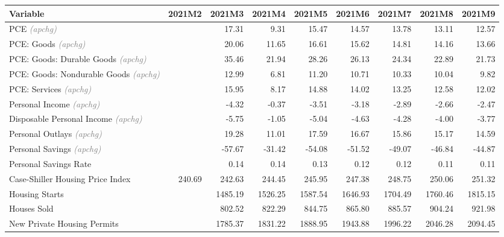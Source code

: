 \documentclass[11pt, letterpaper]{article}\usepackage[]{graphicx}\usepackage[]{color}
\begin{document}
\begin{table}[H]
\centering
\begingroup\fontsize{10pt}{12pt}\selectfont
\begin{tabular}{lrrrrrrrr}
  \hline
Variable & 2021M2 & 2021M3 & 2021M4 & 2021M5 & 2021M6 & 2021M7 & 2021M8 & 2021M9 \\ 
  \hline
PCE \textit{\footnotesize\textcolor{gray}{(apchg)}} &  & 17.31 & 9.31 & 15.47 & 14.57 & 13.78 & 13.11 & 12.57 \\ 
  PCE: Goods \textit{\footnotesize\textcolor{gray}{(apchg)}} &  & 20.06 & 11.65 & 16.61 & 15.62 & 14.81 & 14.16 & 13.66 \\ 
  PCE: Goods: Durable Goods \textit{\footnotesize\textcolor{gray}{(apchg)}} &  & 35.46 & 21.94 & 28.26 & 26.13 & 24.34 & 22.89 & 21.73 \\ 
  PCE: Goods: Nondurable Goods \textit{\footnotesize\textcolor{gray}{(apchg)}} &  & 12.99 & 6.81 & 11.20 & 10.71 & 10.33 & 10.04 & 9.82 \\ 
  PCE: Services \textit{\footnotesize\textcolor{gray}{(apchg)}} &  & 15.95 & 8.17 & 14.88 & 14.02 & 13.25 & 12.58 & 12.02 \\ 
  Personal Income \textit{\footnotesize\textcolor{gray}{(apchg)}} &  & -4.32 & -0.37 & -3.51 & -3.18 & -2.89 & -2.66 & -2.47 \\ 
  Disposable Personal Income \textit{\footnotesize\textcolor{gray}{(apchg)}} &  & -5.75 & -1.05 & -5.04 & -4.63 & -4.28 & -4.00 & -3.77 \\ 
  Personal Outlays \textit{\footnotesize\textcolor{gray}{(apchg)}} &  & 19.28 & 11.01 & 17.59 & 16.67 & 15.86 & 15.17 & 14.59 \\ 
  Personal Savings \textit{\footnotesize\textcolor{gray}{(apchg)}} &  & -57.67 & -31.42 & -54.08 & -51.52 & -49.07 & -46.84 & -44.87 \\ 
  Personal Savings Rate &  & 0.14 & 0.14 & 0.13 & 0.12 & 0.12 & 0.11 & 0.11 \\ 
  Case-Shiller Housing Price Index & 240.69 & 242.63 & 244.45 & 245.95 & 247.38 & 248.75 & 250.06 & 251.32 \\ 
  Housing Starts &  & 1485.19 & 1526.25 & 1587.54 & 1646.93 & 1704.49 & 1760.46 & 1815.15 \\ 
  Houses Sold &  & 802.52 & 822.29 & 844.75 & 865.80 & 885.57 & 904.24 & 921.98 \\ 
  New Private Housing Permits &  & 1785.37 & 1831.22 & 1888.95 & 1943.88 & 1996.22 & 2046.28 & 2094.45 \\ 

\end{tabular}
\end{table}
\end{document}
